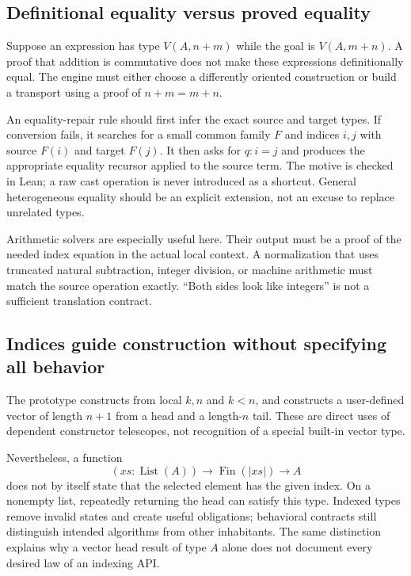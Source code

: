 \subsection{Definitional equality versus proved equality}

Suppose an expression has type $V(A,n+m)$ while the goal is $V(A,m+n)$. A proof
that addition is commutative does not make these expressions definitionally
equal. The engine must either choose a differently oriented construction or
build a transport using a proof of $n+m=m+n$.

An equality-repair rule should first infer the exact source and target types.
If conversion fails, it searches for a small common family $F$ and indices
$i,j$ with source $F(i)$ and target $F(j)$. It then asks for $q:i=j$ and produces
the appropriate equality recursor applied to the source term. The motive is
checked in Lean; a raw cast operation is never introduced as a shortcut.
General heterogeneous equality should be an explicit extension, not an excuse
to replace unrelated types.

Arithmetic solvers are especially useful here. Their output must be a proof of
the needed index equation in the actual local context. A normalization that
uses truncated natural subtraction, integer division, or machine arithmetic
must match the source operation exactly. ``Both sides look like integers'' is
not a sufficient translation contract.

\subsection{Indices guide construction without specifying all behavior}

The prototype constructs  from local $k,n$ and $k<n$, and constructs
a user-defined vector of length $n+1$ from a head and a length-$n$ tail. These
are direct uses of dependent constructor telescopes, not recognition of a
special built-in vector type.

Nevertheless, a function
\[
 (xs:\operatorname{List}(A))\to\operatorname{Fin}(|xs|)\to A
\]
does not by itself state that the selected element has the given index. On a
nonempty list, repeatedly returning the head can satisfy this type. Indexed
types remove invalid states and create useful obligations; behavioral
contracts still distinguish intended algorithms from other inhabitants.
The same distinction explains why a vector head result of type $A$ alone does
not document every desired law of an indexing API.

